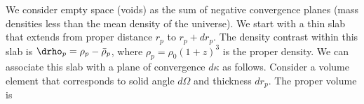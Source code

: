 We consider empty space (voids) as the sum of negative convergence planes  (mass densities less than the mean density of the universe). We start with a thin slab that extends from proper distance $r_p$ to $r_p+dr_p$.  The density contrast within this slab is $\drho_p = \rho_p - \bar\rho_p$, where $\rho_p = \rho_0 (1+z)^3$ is the proper density.  We can associate this slab with a plane of convergence $d\kappa$ as follows.  Consider a volume element that corresponds to solid angle $d\Omega$ and thickness $dr_p$.  The proper volume is
  
  
  